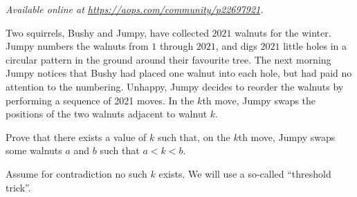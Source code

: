 \textsl{Available online at \url{https://aops.com/community/p22697921}.}
\begin{mdframed}[style=mdpurplebox,frametitle={Problem statement}]
Two squirrels, Bushy and Jumpy, have collected $2021$ walnuts for the winter.
Jumpy numbers the walnuts from $1$ through $2021$, and digs $2021$ little holes
in a circular pattern in the ground around their favourite tree.
The next morning Jumpy notices that Bushy had placed one walnut into each hole,
but had paid no attention to the numbering.
Unhappy, Jumpy decides to reorder the walnuts by performing a sequence of 2021 moves.
In the $k$th move, Jumpy swaps the positions of the two walnuts adjacent to walnut $k$.

Prove that there exists a value of $k$ such that, on the $k$th move,
Jumpy swaps some walnuts $a$ and $b$ such that $a<k<b$.
\end{mdframed}
Assume for contradiction no such $k$ exists.
We will use a so-called ``threshold trick''.

